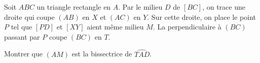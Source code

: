\bigskip


\begin{exo}

\medskip

Soit $ABC$ un triangle rectangle en $A$. Par le milieu $D$ de $[BC]$, on trace une droite qui coupe $(AB)$ en $X$ et $(AC)$ en $Y$. Sur cette droite, on place le point $P$ tel que $[PD]$ et $[XY]$ aient même milieu $M$. La perpendiculaire à $(BC)$ passant par $P$ coupe $(BC)$ en $T$. 

Montrer que $(AM)$ est la bissectrice de $\widehat{TAD}$.

\end{exo}


\begin{center}


\end{center}
